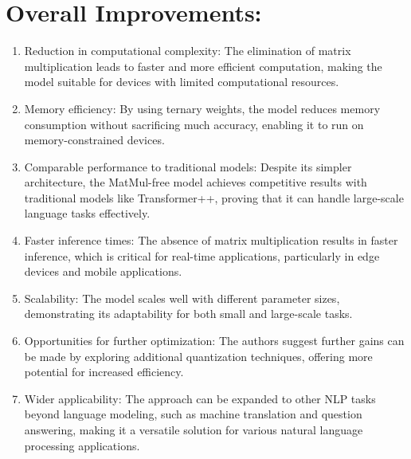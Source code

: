 \documentclass{report}
\begin{document}
	\section{Overall Improvements:}
	\begin{enumerate}
		\item 
		Reduction in computational complexity: The elimination of matrix multiplication leads to faster and more efficient computation, making the model suitable for devices with limited computational resources.
		
		\item 
		Memory efficiency: By using ternary weights, the model reduces memory consumption without sacrificing much accuracy, enabling it to run on memory-constrained devices.
		
		\item 
		Comparable performance to traditional models: Despite its simpler architecture, the MatMul-free model achieves competitive results with traditional models like Transformer++, proving that it can handle large-scale language tasks effectively.
		
		\item 
		Faster inference times: The absence of matrix multiplication results in faster inference, which is critical for real-time applications, particularly in edge devices and mobile applications.
		
		\item 
		Scalability: The model scales well with different parameter sizes, demonstrating its adaptability for both small and large-scale tasks.
		
		\item 
		Opportunities for further optimization: The authors suggest further gains can be made by exploring additional quantization techniques, offering more potential for increased efficiency.
		
		\item 
		Wider applicability: The approach can be expanded to other NLP tasks beyond language modeling, such as machine translation and question answering, making it a versatile solution for various natural language processing applications.
	\end{enumerate}
	
	

	

	

	

	
\end{document}
